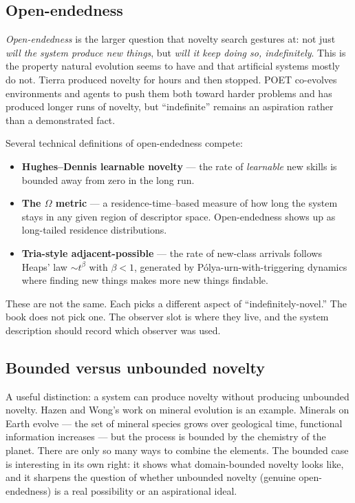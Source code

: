\subsection*{Open-endedness}

\emph{Open-endedness} is the larger question that novelty search
gestures at: not just \emph{will the system produce new things}, but
\emph{will it keep doing so, indefinitely}. This is the property natural
evolution seems to have and that artificial systems mostly do not.
Tierra produced novelty for hours and then stopped. POET co-evolves
environments and agents to push them both toward harder problems and
has produced longer runs of novelty, but ``indefinite'' remains an
aspiration rather than a demonstrated fact.

Several technical definitions of open-endedness compete:

\begin{itemize}[leftmargin=1.5em,itemsep=2pt]
  \item \textbf{Hughes--Dennis learnable novelty} --- the rate of
    \emph{learnable} new skills is bounded away from zero in the long
    run.
  \item \textbf{The $\Omega$ metric} --- a residence-time--based measure
    of how long the system stays in any given region of descriptor
    space. Open-endedness shows up as long-tailed residence
    distributions.
  \item \textbf{Tria-style adjacent-possible} --- the rate of new-class
    arrivals follows Heaps' law $\sim t^\beta$ with $\beta<1$, generated
    by P\'olya-urn-with-triggering dynamics where finding new things
    makes more new things findable.
\end{itemize}

These are not the same. Each picks a different aspect of
``indefinitely-novel.'' The book does not pick one. The observer slot is
where they live, and the system description should record which observer
was used.

\subsection*{Bounded versus unbounded novelty}

A useful distinction: a system can produce novelty without producing
unbounded novelty. Hazen and Wong's work on mineral evolution is an
example. Minerals on Earth evolve --- the set of mineral species grows
over geological time, functional information increases --- but the
process is bounded by the chemistry of the planet. There are only so
many ways to combine the elements. The bounded case is interesting in
its own right: it shows what domain-bounded novelty looks like, and it
sharpens the question of whether unbounded novelty (genuine
open-endedness) is a real possibility or an aspirational ideal.

